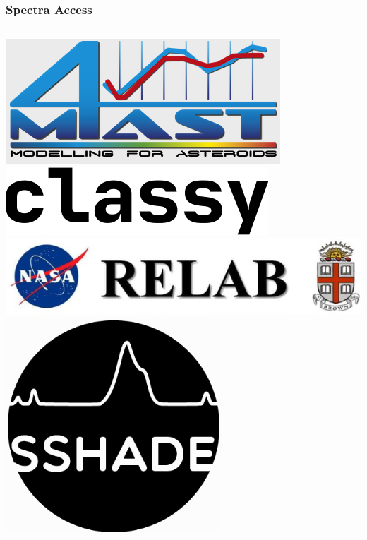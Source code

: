 \begin{frame}
  \frametitle{Spectra Access}

  \begin{columns}[T]

      \begin{column}{.3\textwidth}
        \vspace{0.5em}\includegraphics[width=.8\textwidth]{gfx/logo_m4ast}\\
        \vspace{0.5em}\includegraphics[width=.8\textwidth]{gfx/logo_classy}\\
        \vspace{0.5em}\includegraphics[width=.8\textwidth]{gfx/logo_relab}\\
        \vspace{0.5em}\includegraphics[width=.8\textwidth]{gfx/logo_sshade}\\
      \end{column}



\end{columns}
\end{frame}

